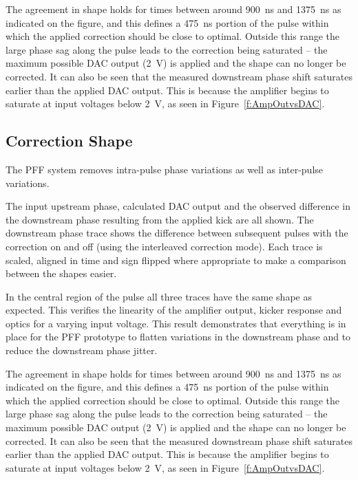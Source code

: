 The agreement in shape holds for times between around 900~ns and 1375~ns as 
indicated on the figure, and this defines a 475~ns portion of the pulse within 
which the applied correction should be close to optimal. Outside this range the 
large phase sag along the pulse leads 
to the correction being saturated -- the maximum possible DAC output 
(2~V) is applied and the shape can no longer be corrected. It can also
be seen that the measured downstream phase shift saturates earlier than
the applied DAC output. This is because the amplifier begins to 
saturate at input voltages below 2~V, as seen in Figure~\ref{f:AmpOutvsDAC}.

\subsection{\label{ss:corrShape}Correction Shape}

The PFF system removes intra-pulse phase variations as well as inter-pulse 
variations. 

The input upstream phase, calculated DAC output and the observed difference in 
the downstream phase resulting from the applied kick are all shown. The 
downstream phase trace shows the difference between subsequent pulses with the 
correction on and off (using the interleaved correction mode). 
Each trace is scaled, aligned in time and sign flipped where appropriate to 
make a comparison between the shapes easier.

In the central region of the pulse all three traces have the same shape as 
expected. This verifies the linearity of the amplifier output, kicker response 
and optics for a varying input voltage. This result demonstrates that 
everything is in place for the PFF prototype to flatten variations in the 
downstream phase and to reduce the downstream phase jitter.

The agreement in shape holds for times between around 900~ns and 1375~ns as 
indicated on the figure, and this defines a 475~ns portion of the pulse within 
which the applied correction should be close to optimal. Outside this range the 
large phase sag along the pulse leads 
to the correction being saturated -- the maximum possible DAC output 
(2~V) is applied and the shape can no longer be corrected. It can also
be seen that the measured downstream phase shift saturates earlier than
the applied DAC output. This is because the amplifier begins to 
saturate at input voltages below 2~V, as seen in Figure~\ref{f:AmpOutvsDAC}.

